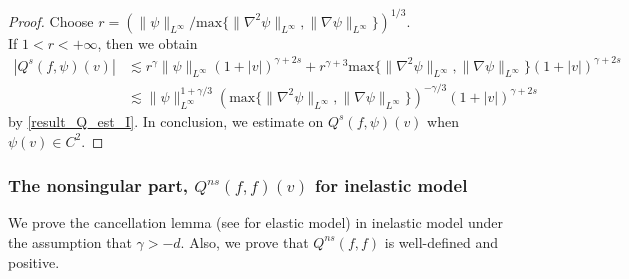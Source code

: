 \documentclass[reqno,10pt]{amsart}
\numberwithin{equation}{section}
\begin{document}
\begin{proof}
\noindent Choose $r=(\|\psi\|_{L^{\infty}}/\text{max}\{\|\nabla^2 \psi\|_{L^\infty}, \|\nabla \psi\|_{L^\infty} \})^{1/3}.$\\
\noindent If $1<r<+\infty$, then we obtain
\begin{align*}
      |Q^{s}(f,\psi)(v)| &\lesssim r^{\gamma}\|\psi\|_{L^{\infty}}(1+|v|)^{\gamma+2s} + r^{\gamma+3}\text{max}\{\|\nabla^2 \psi\|_{L^\infty}, \|\nabla \psi\|_{L^\infty} \}(1+|v|)^{\gamma+2s}\\
     &\lesssim  \|\psi\|_{L^{\infty}}^{1+\gamma/3}(\text{max}\{\|\nabla^2 \psi\|_{L^\infty}, \|\nabla \psi\|_{L^\infty} \})^{-\gamma/3}(1+|v|)^{\gamma+2s}
\end{align*} by \eqref{result_Q_est_I}. In conclusion, we estimate on $Q^{s}(f,\psi)(v)$ when  $\psi(v)\in C^2.$ 
\end{proof} \vspace{2mm}

\subsubsection{The nonsingular part, $Q^{ns}(f,f)(v)$ for inelastic model}
We prove the cancellation lemma (see \cite{AD2000} for elastic model) in inelastic model under the assumption that $\gamma > -d$. Also, we prove that $Q^{ns}(f,f)$ is well-defined and positive.
\end{document}
